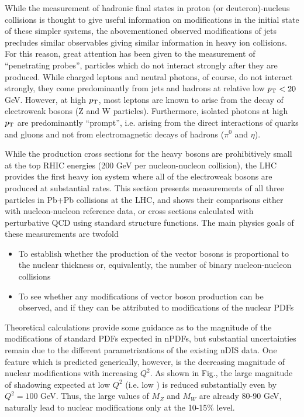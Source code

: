 While the measurement of hadronic final states in proton (or deuteron)-nucleus collisions
is thought to give useful information on modifications in the initial state of these
simpler systems, the abovementioned observed modifications of jets precludes similar
observables giving similar information in heavy ion collisions.
For this reason, great attention has been given to the measurement of 
``penetrating probes'', particles which do not interact strongly after they are produced.
While charged leptons and neutral photons, of course, 
do not interact strongly, they come predominantly from
jets and hadrons at relative low $\mbox{$p_{\mathrm{T}}$} < 20$ GeV.
However, at high $\mbox{$p_{\mathrm{T}}$}$, most leptons are known to arise from the decay of electroweak
bosons (Z and W particles).  Furthermore, isolated photons at high $\mbox{$p_{\mathrm{T}}$}$ are predominantly 
``prompt'', i.e. arising from the direct interactions of quarks and gluons and not from
electromagnetic decays of hadrons ($\pi^0$ and $\eta$).

While the production cross sections for the heavy bosons are prohibitively small at the
top RHIC energies (200 GeV per nucleon-nucleon collision), the LHC provides the first
heavy ion system where all of the electroweak bosons are produced at substantial rates.
This section presents measurements of all three particles in Pb+Pb collisions at the LHC,
and shows their comparisons either with nucleon-nucleon reference data, or cross sections
calculated with perturbative QCD using standard structure functions.
The main physics goals of these measurements are twofold
\begin{itemize}
\item To establish whether the production of the vector bosons is proportional to the 
nuclear thickness or, equivalently, the number of binary nucleon-nucleon collisions
\item To see whether any modifications of vector boson production can be observed,
and if they can be attributed to modifications of the nuclear PDFs
\end{itemize}
Theoretical calculations provide some guidance as to the magnitude of the modifications
of standard PDFs expected in nPDFs, but substantial uncertainties remain due to the 
different parametrizations of the existing nDIS data.
One feature which is predicted generically, however, is the decreasing magnitude of
nuclear modifications with increasing $Q^2$.  As shown in Fig., the large magnitude
of shadowing expected at low $Q^2$ (i.e. low \pT) is reduced substantially even by 
$Q^2=100$ GeV.  Thus, the large values of $M_Z$ and $M_W$ are already 80-90 GeV, naturally lead
to nuclear modifications only at the 10-15\% level.

